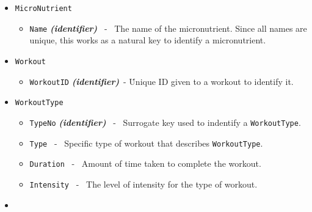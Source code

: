 \documentclass{report}
\begin{document}
\begin{itemize}
\begin{itemize}[label=$\circ$]
        \end{itemize}
    \item\texttt{MicroNutrient}
        \begin{itemize}[label=$\circ$]
            \item \texttt{Name} \textit{\textbf{(identifier)}} \ - \ The name of the micronutrient. Since all names are unique, this works as a natural key to identify a micronutrient.
        \end{itemize}
    \item \texttt{Workout}
        \begin{itemize}[label=$\circ$]
    \item \texttt{WorkoutID} \textit{\textbf{(identifier)}}\ - \. Unique ID given to a workout to identify it.
        \end{itemize}
    \item \texttt{WorkoutType}
        \begin{itemize}[label=$\circ$]
            \item \texttt{TypeNo} \textit{\textbf{(identifier)}} \ - \ Surrogate key used to  indentify a \texttt{WorkoutType}.
            \item \texttt{Type} \ - \ Specific type of workout that describes \texttt{WorkoutType}. 
            \item  \texttt{Duration} \ - \ Amount of time taken to complete the workout.
            \item \texttt{Intensity} \ - \ The level of intensity for the type of workout.
        \end{itemize}
    \item \texttt{}
\end{itemize}
\end{document}
